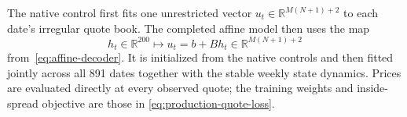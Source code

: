 \documentclass[11pt,a4paper]{article}
\newcommand{\R}{\mathbb{R}}
\begin{document}
The native control first fits one unrestricted vector
$u_t\in\R^{M(N+1)+2}$ to each date's irregular quote book.  The completed
affine model then uses the map
\[
  h_t\in\R^{200}
  \longmapsto
  u_t=b+Bh_t\in\R^{M(N+1)+2}
\]
from~\eqref{eq:affine-decoder}.  It is initialized from the native controls
and then fitted jointly across all 891 dates together with the stable weekly
state dynamics.  Prices are evaluated directly at every observed quote; the
training weights and inside-spread objective are those in
\eqref{eq:production-quote-loss}.




\newpage 
   
   
\end{document}
